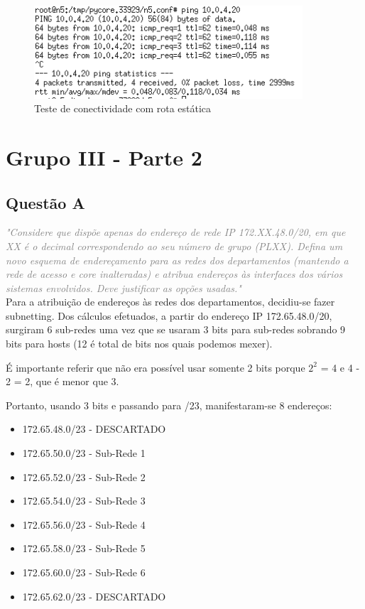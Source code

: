 \documentclass{llncs}
\newcommand{\questionE}[1]{\textcolor{gray}{\textit{"#1"}}}
\begin{document}
\begin{figure}[H]
\begin{center}
\includegraphics[width=10cm]{PARTEB_2e_ping.PNG}
\end{center}
\caption{Teste de conectividade com rota estática}
\end{figure}

\clearpage

\section{Grupo III - Parte 2}

\subsection{Questão A}
\hspace{3mm} 
\questionE{Considere que dispõe apenas do endereço de rede IP 172.XX.48.0/20, em que XX é o decimal correspondendo ao seu número de grupo (PLXX). Defina um novo esquema de endereçamento para as redes dos departamentos (mantendo a rede de acesso e core inalteradas) e atribua endereços às interfaces dos vários sistemas envolvidos. Deve justificar as opções usadas.}\\

Para a atribuição de endereços às redes dos departamentos, decidiu-se fazer subnetting.
Dos cálculos efetuados, a partir do endereço IP 172.65.48.0/20, surgiram 6 sub-redes uma vez que se usaram 3 bits para sub-redes sobrando 9 bits para hosts (12 é total de bits nos quais podemos mexer).

É importante referir que não era possível usar somente 2 bits porque ${2}^2$ = 4 e 4 - 2 = 2, que é menor que 3. 

Portanto, usando 3 bits e passando para /23, manifestaram-se 8 endereços:
\begin{itemize}
    \item 172.65.48.0/23 - DESCARTADO
    \item 172.65.50.0/23 - Sub-Rede 1
    \item 172.65.52.0/23 - Sub-Rede 2
    \item 172.65.54.0/23 - Sub-Rede 3
    \item 172.65.56.0/23 - Sub-Rede 4
    \item 172.65.58.0/23 - Sub-Rede 5
    \item 172.65.60.0/23 - Sub-Rede 6
    \item 172.65.62.0/23 - DESCARTADO
\end{itemize}
\end{document}
